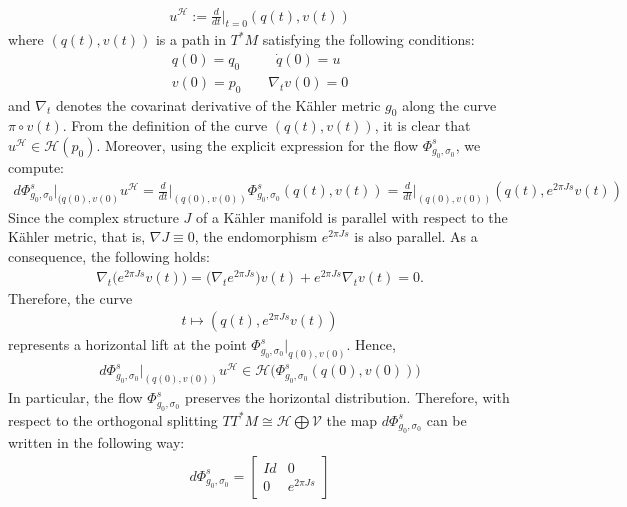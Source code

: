 \documentclass[11pt]{amsart}
\theoremstyle{plain}
\theoremstyle{definition}
\theoremstyle{remark}
\begin{document}
\begin{align}
   u^{\mathcal{H}}:= \frac{d}{dt}\Bigg|_{t=0} (q(t),v(t))
\end{align}
where $(q(t),v(t))$ is a path in $T^*M$ satisfying the following conditions:
\begin{align}
    q(0) = q_0& \;\;\;\;\;\; \dot{q}(0)=u \\\nonumber v(0) =p_0& \;\;\;\; \nabla_{t}v(0) =0
\end{align}
and $\nabla_{t}$ denotes the covarinat derivative of the K\"ahler metric $g_0$ along the curve $\pi \circ v(t)$. From the definition of the curve $(q(t),v(t))$, it is clear that 
$u^{\mathcal{H}} \in \mathcal{H}(p_0)$. Moreover, using the explicit 
expression for the flow $\Phi_{g_0,\sigma_0}^s$, we compute:
\begin{align}
    d \Phi_{g_0,\sigma_0}^s\big|_{(q(0),v(0)}  u^{\mathcal{H}} = \frac{d}{dt}\Bigg|_{(q(0),v(0))} \Phi_{g_0,\sigma_0}^s(q(t),v(t)) = \frac{d}{dt}\Bigg|_{(q(0),v(0))} (q(t), e^{2\pi J s}v(t))
\end{align}
Since the complex structure $J$ of a K\"ahler manifold is parallel with respect 
to the K\"ahler metric, that is, $\nabla J \equiv 0$, the endomorphism 
$e^{2\pi J s}$ is also parallel. As a consequence, the following holds:
\begin{align}
    \nabla_{t}\Big(e^{2\pi J s}v(t)\Big)
    =
    \Big(\nabla_t e^{2\pi J s}\Big)v(t)
    +
    e^{2\pi J s}\nabla_t v(t)
    =
    0.
\end{align}
Therefore, the curve 
\begin{align}
    t \mapsto (q(t), e^{2\pi J s}v(t))
\end{align}
represents a horizontal lift at the point 
$\Phi_{g_0,\sigma_0}^s\vert_{q(0),v(0)}$. Hence,
\begin{align}
    d \Phi_{g_0,\sigma_0}^s\big|_{(q(0),v(0))}  u^{\mathcal{H}} 
    \in 
    \mathcal{H}\big({\Phi_{g_0,\sigma_0}^s(q(0),v(0))}\big)
\end{align}
In particular, the flow $\Phi_{g_0,\sigma_0}^s$ preserves the horizontal distribution. Therefore, with respect to the orthogonal splitting $TT^*M \cong \mathcal{H} \bigoplus \mathcal{V}$ the map $d\Phi_{g_0,\sigma_0}^s$ can be written in the following way:
\begin{align}\label{rotation_is_killing}
    d\Phi_{g_0,\sigma_0}^s = \begin{bmatrix}
    Id & 0\\
    0 & e^{2\pi J s}
\end{bmatrix}
\end{align}
\end{document}
